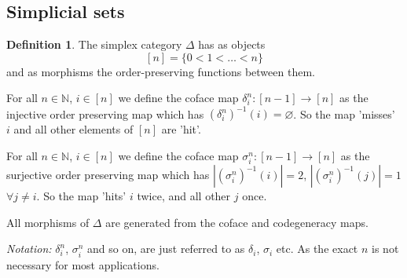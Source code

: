 \documentclass[12pt]{article}
\theoremstyle{definition}
\newtheorem{definition}{Definition}[section]
\newcommand{\N}{\mathbb{N}}
\newcommand{\1}{\mathbbm{1}}
\begin{document}
\subsection{Simplicial sets}
\begin{definition}
    The simplex category $\Delta$ has as objects
    \[
        [n] = \{0 < 1 < \dots < n\}
    \]
    and as morphisms the order-preserving functions between them.

    For all $n\in\N$, $i\in [n]$ we define the coface map $\delta^n_i: [n-1]\to [n]$ as the injective order preserving map which has $(\delta^n_i)^{-1}(i) = \varnothing$. So the map 'misses' $i$ and all other elements of $[n]$ are 'hit'.

    For all $n\in\N$, $i\in [n]$ we define the coface map $\sigma^n_i: [n-1]\to [n]$ as the surjective order preserving map which has $|(\sigma^n_i)^{-1}(i)| = 2$, $|(\sigma^n_i)^{-1}(j)| = 1$ $\forall j\neq i$. So the map 'hits' $i$ twice, and all other $j$ once.

    All morphisms of $\Delta$ are generated from the coface and codegeneracy maps.
\end{definition}

\textit{Notation: } $\delta_i^n$, $\sigma_i^n$ and so on, are just referred to as $\delta_i$, $\sigma_i$ etc. As the exact $n$ is not necessary for most applications. 
\end{document}
